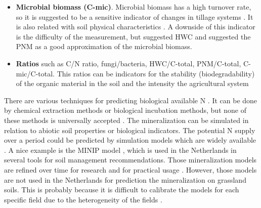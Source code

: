 \documentclass[10pt,twoside,dutch,english]{report}
\begin{document}
\begin{itemize}
	\item \textbf{Microbial biomass (C-mic)}. Microbial biomass has a high turnover rate, so it is suggested to be a sensitive indicator of changes in tillage systems \citep{Lynch1980, Sparling1997}. It is also related with soil physical characteristics \citep{Schimel1986}. A downside of this indicator is the difficulty of the measurement, but \citet{Sparling1992} suggested HWC and \citet{Myrold1987} suggested the PNM as a good approximation of the microbial biomass. 
	
	\item \textbf{Ratios} such as C/N ratio, fungi/bacteria, HWC/C-total, PNM/C-total, C-mic/C-total. This ratios can be indicators for the stability (biodegradability) of the organic material in the soil \citep{Sparling1992, Hanegraaf2009} and the intensity the agricultural system \citep{Bloem2004}
	
\end{itemize}
		
	There are various techniques for predicting biological available N \citep{Haynes2005}. It can be done by chemical extraction methods or biological incubation methods, but none of these methods is universally accepted \citep{Nannipieri2009}. The mineralization can be simulated in relation to abiotic soil properties or biological indicators. The potential N supply over a period could be predicted by simulation models which are widely available \citep{Manzoni2009}. A nice example is the MINIP model \citep{Janssen1984}, which is used in the Netherlands in several tools for soil management recommendations. Those mineralization models are refined over time for research and for practical usage \citep{Yang2000,Postma2004}.  However, those models are not used in the Netherlands for prediction the mineralization on grassland soils. This is probably because it is difficult to calibrate the models for each specific field due to the heterogeneity of the fields \citep{Ros2015}. 
		
\end{document}
